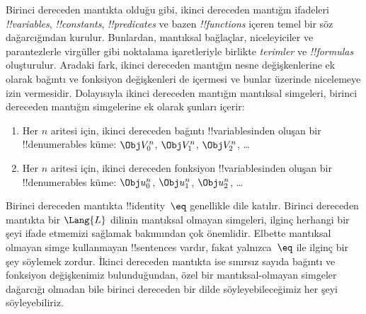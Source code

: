 



Birinci dereceden mantıkta olduğu gibi, ikinci dereceden mantığın ifadeleri
\emph{!!{variable}s}, \emph{!!{constant}s}, \emph{!!{predicate}s} ve bazen
\emph{!!{function}s} içeren temel bir söz dağarcığından kurulur. Bunlardan,
mantıksal bağlaçlar, niceleyiciler ve parantezlerle virgüller gibi noktalama
işaretleriyle birlikte \emph{terimler} ve \emph{!!{formula}s} oluşturulur.
Aradaki fark, ikinci dereceden mantığın nesne değişkenlerine ek olarak bağıntı
ve fonksiyon değişkenleri de içermesi ve bunlar üzerinde nicelemeye izin
vermesidir. Dolayısıyla ikinci dereceden mantığın mantıksal simgeleri, birinci
dereceden mantığın simgelerine ek olarak şunları içerir:

\begin{enumerate}
\item Her $n$ aritesi için, ikinci dereceden bağıntı !!{variable}s{}inden oluşan bir
  !!{denumerable}s küme: $\Obj V_0^n$, $\Obj V_1^n$, $\Obj V_2^n$, \dots
\item Her $n$ aritesi için, ikinci dereceden fonksiyon !!{variable}s{}inden oluşan bir
  !!{denumerable}s küme: $\Obj u_0^n$, $\Obj u_1^n$, $\Obj u_2^n$, \dots
\end{enumerate}

Birinci dereceden mantıkta !!{identity}~$\eq$ genellikle dile katılır.
Birinci dereceden mantıkta bir $\Lang{L}$ dilinin mantıksal olmayan simgeleri,
ilginç herhangi bir şeyi ifade etmemizi sağlamak bakımından çok önemlidir.
Elbette mantıksal olmayan simge kullanmayan !!{sentence}s vardır, fakat
yalnızca~$\eq$ ile ilginç bir şey söylemek zordur. İkinci dereceden mantıkta
ise sınırsız sayıda bağıntı ve fonksiyon değişkenimiz bulunduğundan, özel bir
mantıksal-olmayan simgeler dağarcığı olmadan bile birinci dereceden bir dilde
söyleyebileceğimiz her şeyi söyleyebiliriz.

